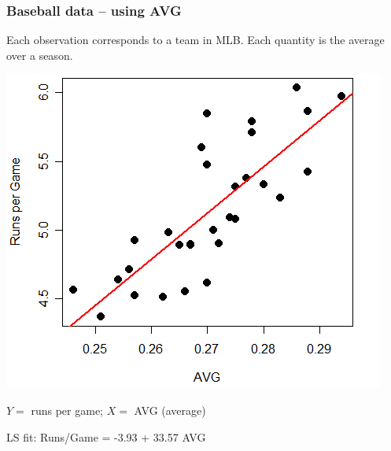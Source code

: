\documentclass{beamer}
\newcommand{\sk}{\vspace{.5cm}}
\begin{document}
\begin{frame}
\frametitle{Baseball data -- using AVG} 

\sk
Each observation corresponds to a team in MLB. Each quantity is the average over a season. 

\vspace{-3mm}
\begin{center}
\includegraphics[scale=0.42]{figures/AvgR.png}	
\end{center}

\vspace{-5.8mm}
$Y=$ runs per game; $X=$ AVG (average)


LS fit: {\color{red} Runs/Game = -3.93 + 33.57 AVG}
\end{frame}
\end{document}
